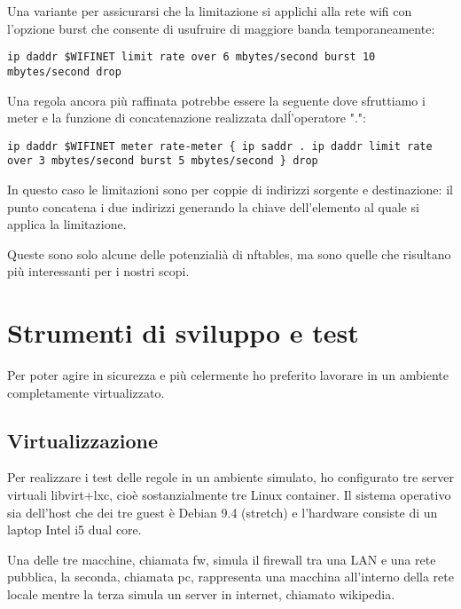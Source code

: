 Una variante per assicurarsi che la limitazione si applichi alla rete wifi con
l'opzione burst che consente di usufruire di maggiore banda temporaneamente:
\begin{lstlisting}[style=customc,firstnumber=20]
ip daddr $WIFINET limit rate over 6 mbytes/second burst 10 mbytes/second drop
\end{lstlisting}

Una regola ancora pi\`u raffinata potrebbe essere la seguente dove sfruttiamo
i meter e la funzione di concatenazione realizzata dalĺ'operatore ".":
\begin{lstlisting}[style=customc,firstnumber=20]
ip daddr $WIFINET meter rate-meter { ip saddr . ip daddr limit rate over 3 mbytes/second burst 5 mbytes/second } drop
\end{lstlisting}
In questo caso le limitazioni sono per coppie di indirizzi sorgente e
destinazione: il punto concatena i due indirizzi generando la chiave
dell'elemento al
quale si applica la limitazione.

Queste sono solo alcune delle potenziali\`a di nftables, ma sono quelle che
risultano pi\`u interessanti per i nostri scopi.

\chapter{Strumenti di sviluppo e test}

Per poter agire in sicurezza e pi\`u celermente ho preferito lavorare in un
ambiente completamente virtualizzato.

\section{Virtualizzazione}
Per realizzare i test delle regole in un ambiente simulato, ho configurato tre
server virtuali libvirt+lxc, cio\`e sostanzialmente tre Linux container.  Il
sistema operativo sia dell'host che dei tre guest \`e Debian 9.4 (stretch) e
l'hardware consiste di un laptop Intel i5 dual core.

Una delle tre macchine, chiamata fw, simula il firewall tra una LAN e una rete
pubblica, la seconda, chiamata pc, rappresenta una macchina all'interno della rete
locale mentre la terza simula un server in internet, chiamato wikipedia.

